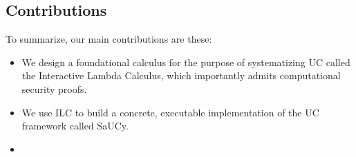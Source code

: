 \subsection{Contributions}
\label{subsec:contributions}

To summarize, our main contributions are these:

\begin{itemize}[leftmargin=*]
  \item We design a foundational calculus for the purpose of systematizing UC
    called the Interactive Lambda Calculus, which importantly admits
    computational security proofs.
  \item We use ILC to build a concrete, executable implementation of the UC
    framework called SaUCy.
  \item {}
\end{itemize}

